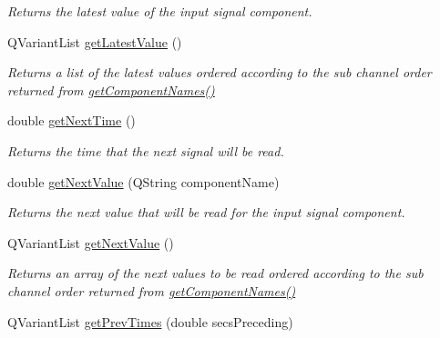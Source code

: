\begin{DoxyCompactItemize}
\begin{DoxyCompactList}\small\item\em Returns the latest value of the input signal component. \end{DoxyCompactList}\item 
\hypertarget{class_picto_1_1_analysis_signal_data_a1137559576b92fbcaa12db2c02d5f5d1}{Q\-Variant\-List \hyperlink{class_picto_1_1_analysis_signal_data_a1137559576b92fbcaa12db2c02d5f5d1}{get\-Latest\-Value} ()}\label{class_picto_1_1_analysis_signal_data_a1137559576b92fbcaa12db2c02d5f5d1}

\begin{DoxyCompactList}\small\item\em Returns a list of the latest values ordered according to the sub channel order returned from \hyperlink{class_picto_1_1_analysis_signal_data_af57ef0d6d246b5dc7f5d9b9419123181}{get\-Component\-Names()} \end{DoxyCompactList}\item 
double \hyperlink{class_picto_1_1_analysis_signal_data_a9da949c2f26e15e198cd3eb128c9df8a}{get\-Next\-Time} ()
\begin{DoxyCompactList}\small\item\em Returns the time that the next signal will be read. \end{DoxyCompactList}\item 
double \hyperlink{class_picto_1_1_analysis_signal_data_a8a99a3596b38542f6a59b095370e0a3d}{get\-Next\-Value} (Q\-String component\-Name)
\begin{DoxyCompactList}\small\item\em Returns the next value that will be read for the input signal component. \end{DoxyCompactList}\item 
Q\-Variant\-List \hyperlink{class_picto_1_1_analysis_signal_data_acf4a0112acdd91b0347897489a25fdb3}{get\-Next\-Value} ()
\begin{DoxyCompactList}\small\item\em Returns an array of the next values to be read ordered according to the sub channel order returned from \hyperlink{class_picto_1_1_analysis_signal_data_af57ef0d6d246b5dc7f5d9b9419123181}{get\-Component\-Names()} \end{DoxyCompactList}\item 
\hypertarget{class_picto_1_1_analysis_signal_data_a2f0d0631c8c6e8ae330fb86a4002007a}{Q\-Variant\-List \hyperlink{class_picto_1_1_analysis_signal_data_a2f0d0631c8c6e8ae330fb86a4002007a}{get\-Prev\-Times} (double secs\-Preceding)}\label{class_picto_1_1_analysis_signal_data_a2f0d0631c8c6e8ae330fb86a4002007a}


\end{DoxyCompactItemize}
